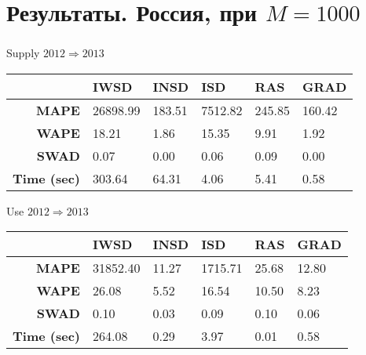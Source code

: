 \documentclass{beamer}
\begin{document}
\section{Результаты. Россия, при $M = 1000$}
\begin{frame}
	\frametitle{\insertsection}
	
	\begin{center}
		Supply $2012 \Rightarrow 2013$
		\begin{tabular}{|r|m{1.5cm}|m{1cm}|m{1.2cm}|m{1cm}|m{1cm}|}
			\hline
			& \textbf{IWSD} & \textbf{INSD} & \textbf{ISD} & \textbf{RAS} & \textbf{GRAD} \\
			\hline
			\textbf{MAPE} & 26898.99 & 183.51 & 7512.82 & 245.85 & 160.42 \\
			\textbf{WAPE} & 18.21 & 1.86 & 15.35 & 9.91 & 1.92 \\
			\textbf{SWAD} & 0.07 & 0.00 & 0.06 & 0.09 & 0.00 \\
			\textbf{Time (sec)} & 303.64 & 64.31 & 4.06 & 5.41 & 0.58 \\
			\hline
		\end{tabular}
	\end{center}
	
	\begin{center}
		Use $2012 \Rightarrow 2013$
		\begin{tabular}{|r|m{1.5cm}|m{1cm}|m{1.2cm}|m{1cm}|m{1cm}|}
			\hline
			& \textbf{IWSD} & \textbf{INSD} & \textbf{ISD} & \textbf{RAS} & \textbf{GRAD} \\
			\hline
			\textbf{MAPE} & 31852.40 & 11.27 & 1715.71 & 25.68 & 12.80 \\
			\textbf{WAPE} & 26.08 & 5.52 & 16.54 & 10.50 & 8.23 \\
			\textbf{SWAD} & 0.10 & 0.03 & 0.09 & 0.10 & 0.06 \\
			\textbf{Time (sec)} & 264.08 & 0.29 & 3.97 & 0.01 & 0.58 \\
			\hline
		\end{tabular}
	\end{center}
	
\end{frame}
\end{document}

